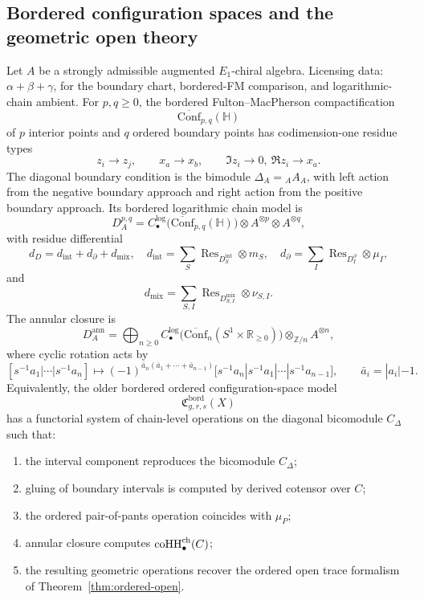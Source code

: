 \subsection{Bordered configuration spaces and the geometric open theory}

\begin{theorem}
\label{conj:bordered}
Let \(A\) be a strongly admissible augmented \(E_1\)-chiral algebra.
Licensing data: \(\alpha+\beta+\gamma\), for the boundary chart,
bordered-FM comparison, and logarithmic-chain ambient.
For \(p,q\geq0\), the bordered Fulton--MacPherson compactification
\[
\overline{\mathrm{Conf}}_{p,q}(\mathbb H)
\]
of \(p\) interior points and \(q\) ordered boundary points has
codimension-one residue types
\[
z_i\to z_j,\qquad x_a\to x_b,\qquad
\Im z_i\to0,\ \Re z_i\to x_a .
\]
The diagonal boundary condition is the bimodule
\(\Delta_A={}_AA_A\), with left action from the negative boundary
approach and right action from the positive boundary approach. Its
bordered logarithmic chain model is
\[
D_A^{p,q}
=
C_\bullet^{\log}\!\bigl(
\overline{\mathrm{Conf}}_{p,q}(\mathbb H)
\bigr)\otimes A^{\otimes p}\otimes A^{\otimes q},
\]
with residue differential
\[
d_D=d_{\mathrm{int}}+d_{\partial}+d_{\mathrm{mix}},
\quad
d_{\mathrm{int}}=\sum_S\operatorname{Res}_{D_S^{\mathrm{int}}}\otimes m_S,
\quad
d_\partial=\sum_I\operatorname{Res}_{D_I^\partial}\otimes\mu_I,
\]
and
\[
d_{\mathrm{mix}}
=
\sum_{S,I}
\operatorname{Res}_{D_{S,I}^{\mathrm{mix}}}\otimes\nu_{S,I}.
\]
The annular closure is
\[
D_A^{\mathrm{ann}}
=
\bigoplus_{n\ge0}
C_\bullet^{\log}\!\bigl(
\overline{\mathrm{Conf}}_n(S^1\times\mathbb R_{\ge0})
\bigr)\otimes_{\mathbb Z/n}A^{\otimes n},
\]
where cyclic rotation acts by
\[
[s^{-1}a_1|\cdots|s^{-1}a_n]
\mapsto
(-1)^{\bar a_n(\bar a_1+\cdots+\bar a_{n-1})}
[s^{-1}a_n|s^{-1}a_1|\cdots|s^{-1}a_{n-1}],
\qquad
\bar a_i=|a_i|-1.
\]
Equivalently, the older bordered ordered configuration-space model
\[
\mathfrak C^{\mathrm{bord}}_{g,r,s}(X)
\]
has a functorial system of chain-level operations on the diagonal
bicomodule \(C_\Delta\) such that:
\begin{enumerate}[label=(\arabic*)]
\item the interval component reproduces the bicomodule $C_\Delta$;
\item gluing of boundary intervals is computed by derived cotensor over $C$;
\item the ordered pair-of-pants operation coincides with $\mu_P$;
\item annular closure computes $\operatorname{coHH}^{\mathrm{ch}}_\bullet(C)$;
\item the resulting geometric operations recover the ordered open trace formalism of
Theorem~\ref{thm:ordered-open}.
\end{enumerate}
\end{theorem}

